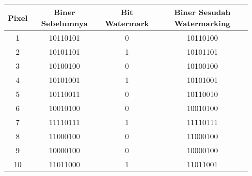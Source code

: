 \documentclass[12pt,a4paper]{article}
\begin{document}
\begin{center}
  \begin{adjustbox}{scale=1,center}
    \begin{tabular}{ |c|c|c|c| } 
      \hline
      Pixel & Biner Sebelumnya & Bit Watermark & Biner Sesudah Watermarking \\ \hline
      1     & 10110101         &      0        & 10110100       \\ \hline
      2     & 10101101         &      1        & 10101101       \\ \hline
      3     & 10100100         &      0        & 10100100       \\ \hline
      4     & 10101001         &      1        & 10101001       \\ \hline
      5     & 10110011         &      0        & 10110010       \\ \hline
      6     & 10010100         &      0        & 10010100       \\ \hline
      7     & 11110111         &      1        & 11110111       \\ \hline
      8     & 11000100         &      0        & 11000100       \\ \hline
      9     & 10000100         &      0        & 10000100       \\ \hline
      10    & 11011000         &      1        & 11011001       \\ \hline
    \end{tabular}
  \end{adjustbox}
\end{center}
\end{document}
